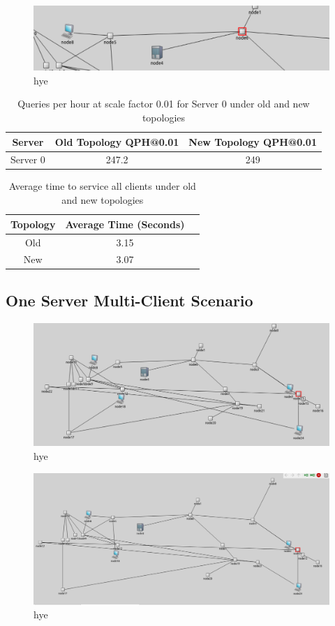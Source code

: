\begin{figure}[tp]
\centering
\includegraphics[width=0.5 \textwidth]{figures/SingleClientNew}
\caption{hye}
\end{figure}

\begin{table}[h!]
\centering
\begin{tabular}{|c|c|c|}
\hline
Server & Old Topology QPH@0.01 & New Topology QPH@0.01 \\ \hline
Server 0 & 247.2 & 249 \\ \hline
\end{tabular}
\caption{Queries per hour at scale factor 0.01 for Server 0 under old and new topologies}
\label{tab:my_label}
\end{table}


\begin{table}[h!]
\centering
\begin{tabular}{|c|c|c|}
\hline
Topology & Average Time (Seconds) \\ \hline
Old & 3.15 \\ \hline
New & 3.07 \\ \hline
\end{tabular}
\caption{Average time to service all clients under old and new topologies}
\label{tab:avg_time_all_clients}
\end{table}



\subsection{One Server Multi-Client Scenario}

\begin{figure}[tp]
\centering
\includegraphics[width=0.5 \textwidth]{figures/MultClientOrig}
\caption{hye}
\end{figure}

\begin{figure}[tp]
\centering
\includegraphics[width=0.5 \textwidth]{figures/MultClientNew}
\caption{hye}
\end{figure}

